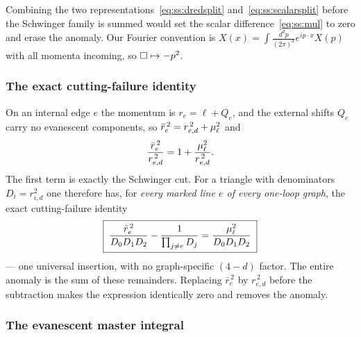 \begin{remark}%
\label{rem:ss:nevercontract}
Combining the two representations~\eqref{eq:ss:dredsplit}
and~\eqref{eq:ss:scalarsplit} before the Schwinger family is summed would set
the scalar difference~\eqref{eq:ss:mul} to zero and erase the anomaly. Our
Fourier convention is $X(x)=\int\frac{d^{d}p}{(2\pi)^{d}}e^{ip\cdot x}X(p)$
with all momenta incoming, so $\Box\mapsto-p^{2}$.
\end{remark}

\subsubsection*{The exact cutting-failure identity}

On an internal edge $e$ the momentum is $r_e=\ell+Q_e$, and the external
shifts $Q_e$ carry no evanescent components, so
$\bar r_e^{\,2}=r_{e,d}^{\,2}+\mu_\ell^{2}$ and
\begin{equation}\label{eq:ss:ratio}
\frac{\bar r_e^{\,2}}{r_{e,d}^{\,2}}=1+\frac{\mu_\ell^{2}}{r_{e,d}^{\,2}} .
\end{equation}
The first term is exactly the Schwinger cut. For a triangle with denominators
$D_i=r_{i,d}^{2}$ one therefore has, for \emph{every marked line $e$ of every
one-loop graph}, the exact cutting-failure identity
\begin{equation}\label{eq:ss:cuttingfailure}
\boxed{\;
\frac{\bar r_e^{\,2}}{D_0D_1D_2}-\frac{1}{\prod_{j\ne e}D_j}
=\frac{\mu_\ell^{2}}{D_0D_1D_2}\;}
\end{equation}
--- one universal insertion, with no graph-specific $(4-d)$ factor. The entire
anomaly is the sum of these remainders. Replacing $\bar r_e^{\,2}$ by
$r_{e,d}^{\,2}$ before the subtraction makes the expression identically zero
and removes the anomaly.

\subsubsection*{The evanescent master integral}

